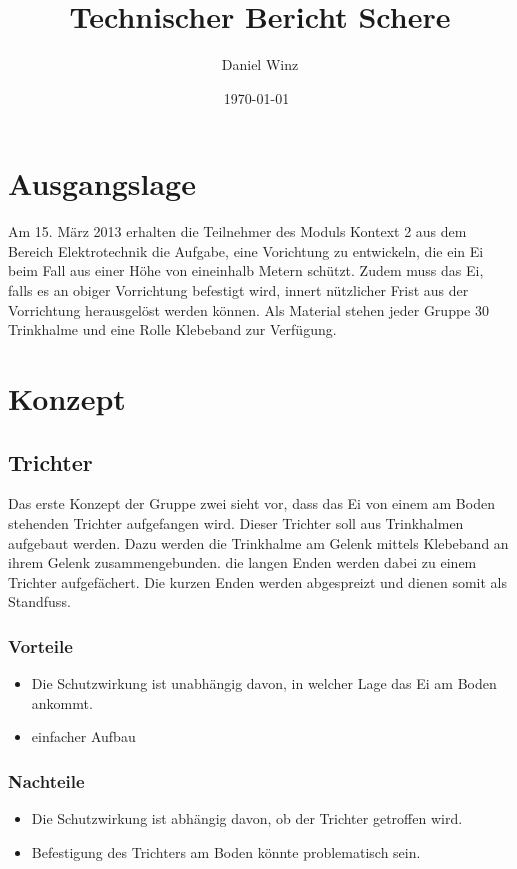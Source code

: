 \documentclass[a4paper,10pt,fleqn]{article}
\title{Technischer Bericht Schere}
\author{Daniel Winz}
\date{\today~\dtc}
\begin{document}
\maketitle

\tableofcontents

\listoffigures


{}

\newpage

% 
\section{Ausgangslage}
Am 15. März 2013 erhalten die Teilnehmer des Moduls Kontext 2 aus dem Bereich 
Elektrotechnik die Aufgabe, eine Vorichtung zu entwickeln, die ein Ei beim Fall 
aus einer Höhe von eineinhalb Metern schützt. Zudem muss das Ei, falls es an 
obiger Vorrichtung befestigt wird, innert nützlicher Frist aus der Vorrichtung 
herausgelöst werden können. Als Material stehen jeder Gruppe 30 Trinkhalme und 
eine Rolle Klebeband zur Verfügung. 
\cite{barmet:aufgabenstellung}

\section{Konzept}
\subsection{Trichter}
Das erste Konzept der Gruppe zwei sieht vor, dass das Ei von einem am Boden 
stehenden Trichter aufgefangen wird. Dieser Trichter soll aus Trinkhalmen 
aufgebaut werden. Dazu werden die Trinkhalme am Gelenk mittels Klebeband an 
ihrem Gelenk zusammengebunden. die langen Enden werden dabei zu einem Trichter 
aufgefächert. Die kurzen Enden werden abgespreizt und dienen somit als 
Standfuss. 

\subsubsection*{Vorteile}
\begin{itemize}
  \item Die Schutzwirkung ist unabhängig davon, in welcher Lage das Ei am Boden 
        ankommt. 
  \item einfacher Aufbau
\end{itemize}

\subsubsection*{Nachteile}
\begin{itemize}
  \item Die Schutzwirkung ist abhängig davon, ob der Trichter getroffen wird. 
  \item Befestigung des Trichters am Boden könnte problematisch sein. 
\end{itemize}
\end{document}
